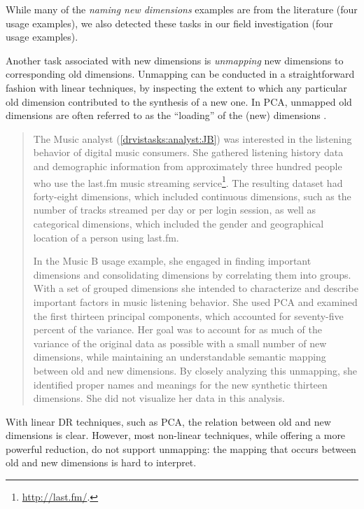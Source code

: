 While many of the {\it naming new dimensions} examples are from the literature (four usage examples), we also detected these tasks in our field investigation (four usage examples). 

Another task associated with new dimensions is {\it unmapping} new dimensions to corresponding old dimensions. 
Unmapping can be conducted in a straightforward fashion with linear techniques, by inspecting the extent to which any particular old dimension contributed to the synthesis of a new one. 
In PCA, unmapped old dimensions are often referred to as the ``loading'' of the (new) dimensions \cite{Jolliffe2002}.

\begin{quotation}
    The {\sc Music} analyst (\ref{drvistasks:analyst:JB}) was interested in the listening behavior of digital music consumers. 
    She gathered listening history data and demographic information from approximately three hundred people who use the last.fm music streaming service\footnote{\url{http://last.fm/}.}. 
    The resulting dataset had forty-eight dimensions, which included continuous dimensions, such as the number of tracks streamed per day or per login session, as well as categorical dimensions, which included the gender and geographical location of a person using last.fm.
    
    In the {\sc Music B} usage example, she engaged in finding important dimensions and consolidating dimensions by correlating them into groups. With a set of grouped dimensions she intended to characterize and describe important factors in music listening behavior. 
    She used \ac{PCA} and examined the first thirteen principal components, which accounted for seventy-five percent of the variance. 
    Her goal was to account for as much of the variance of the original data as possible with a small number of new dimensions, while maintaining an understandable semantic mapping between old and new dimensions. 
    By closely analyzing this unmapping, she identified proper names and meanings for the new synthetic thirteen dimensions.
    She did not visualize her data in this analysis.
\end{quotation}

With linear \ac{DR} techniques, such as \ac{PCA}, the relation between old and new dimensions is clear.
However, most non-linear techniques, while offering a more powerful reduction, do not support unmapping: the mapping that occurs between old and new dimensions is hard to interpret. 

